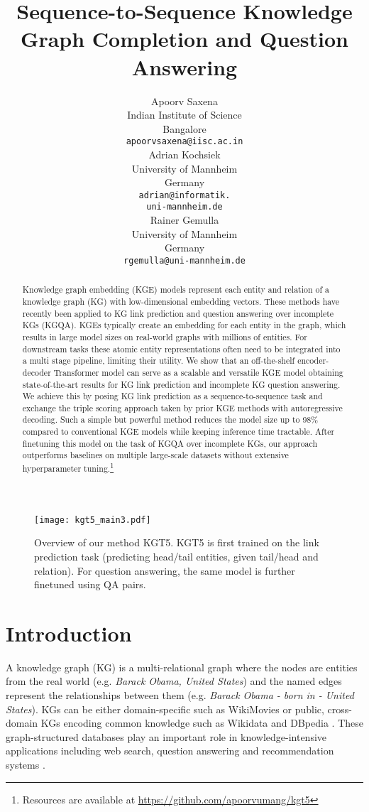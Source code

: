 \documentclass[11pt]{article}
\title{Sequence-to-Sequence Knowledge Graph Completion and Question Answering}
\author{Apoorv Saxena\\
  Indian Institute of Science \\
  Bangalore \\
  \small \texttt{apoorvsaxena@iisc.ac.in} \\
  \And
  Adrian Kochsiek \\
  University of Mannheim \\
  Germany \\
  \small \texttt{adrian@informatik.}\\      
  \small \texttt{uni-mannheim.de} \\
  \And Rainer Gemulla \\
University of Mannheim \\
  Germany \\
\small \texttt{rgemulla@uni-mannheim.de}
   \\ 
  }
\renewcommand\:{\colon} \newcommand{\sset}[1]{\left\{\,#1\,\right\}} \newcommand{\ssets}[1]{\left\{#1\right\}} \newcommand{\ssetn}[1]{\{\,#1\,\}}
\newcommand{\method}{\textsc{KGT5}}
\begin{document}
\maketitle
\begin{abstract}
Knowledge graph embedding (KGE) models represent each entity and relation of a knowledge graph (KG) with low-dimensional embedding vectors.
These methods have recently been applied to KG link prediction and question answering over incomplete KGs (KGQA).
KGEs typically create an embedding for each entity in the graph, which results in large model sizes on real-world graphs with millions of entities. 
For downstream tasks these atomic entity representations often need to be integrated into a multi stage pipeline, limiting their utility.
We show that an off-the-shelf encoder-decoder Transformer model can serve as a scalable and versatile KGE model obtaining state-of-the-art results for KG link prediction and incomplete KG question answering.
We achieve this by posing KG link prediction as a sequence-to-sequence task and exchange the triple scoring approach taken by prior KGE methods with autoregressive decoding.
Such a simple but powerful method reduces the model size up to 98\% compared to conventional KGE models while keeping inference time tractable.
After finetuning this model on the task of KGQA over incomplete KGs, our approach outperforms baselines on multiple large-scale datasets without extensive hyperparameter tuning.\footnote{\label{resources-note}Resources are available at \url{ https://github.com/apoorvumang/kgt5}}





\end{abstract}

\begin{figure*}
  \centering
  \texttt{[image: kgt5\_main3.pdf]}
  \caption{Overview of our method \method{}. KGT5 is first trained on the link prediction task (predicting head/tail entities, given tail/head and relation). For question answering, the same model is further finetuned using QA pairs.
}
  \label{fig:kgt5-main}
\end{figure*}

\section{Introduction}
\label{sec:introduction}


A knowledge graph (KG) is a multi-relational graph where the nodes are entities from the real world (e.g. \textit{Barack Obama, United States}) and the named edges represent the relationships between them (e.g. \textit{Barack Obama - born in - United States}). 
KGs can be either domain-specific such as WikiMovies \cite{miller2016keyvalue} or public, cross-domain KGs encoding common knowledge such as Wikidata and DBpedia \cite{DBLP:journals/corr/abs-2003-00719}. These graph-structured databases play an important role in knowledge-intensive applications including web search, question answering and recommendation systems \cite{kg_survey_paper}. 
\end{document}

